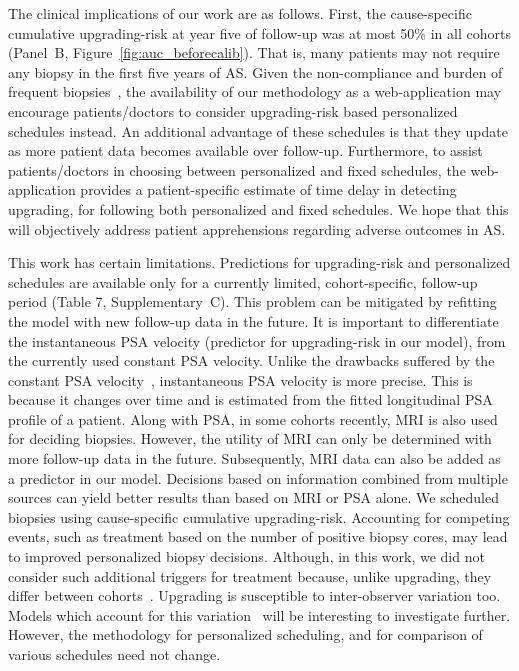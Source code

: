 The clinical implications of our work are as follows. First, the cause-specific cumulative upgrading-risk at year five of follow-up was at most 50\% in all cohorts (Panel~B, Figure~\ref{fig:auc_beforecalib}). That is, many patients may not require any biopsy in the first five years of AS. Given the non-compliance and burden of frequent biopsies~\citep{bokhorst2015compliance}, the availability of our methodology as a web-application may encourage patients/doctors to consider upgrading-risk based personalized schedules instead. An additional advantage of these schedules is that they update as more patient data becomes available over follow-up. Furthermore, to assist patients/doctors in choosing between personalized and fixed schedules, the web-application provides a patient-specific estimate of time delay in detecting upgrading, for following both personalized and fixed schedules. We hope that this will objectively address patient apprehensions regarding adverse outcomes in AS. 

This work has certain limitations. Predictions for upgrading-risk and personalized schedules are available only for a currently limited, cohort-specific, follow-up period (Table 7, Supplementary~C). This problem can be mitigated by refitting the model with new follow-up data in the future. It is important to differentiate the instantaneous PSA velocity (predictor for upgrading-risk in our model), from the currently used constant PSA velocity. Unlike the drawbacks suffered by the constant PSA velocity~\citep{vickers2009psavelocity}, instantaneous PSA velocity is more precise. This is because it changes over time and is estimated from the fitted longitudinal PSA profile of a patient. Along with PSA, in some cohorts recently, MRI is also used for deciding biopsies. However, the utility of MRI can only be determined with more follow-up data in the future. Subsequently, MRI data can also be added as a predictor in our model. Decisions based on information combined from multiple sources can yield better results than based on MRI or PSA alone. We scheduled biopsies using cause-specific cumulative upgrading-risk. Accounting for competing events, such as treatment based on the number of positive biopsy cores, may lead to improved personalized biopsy decisions. Although, in this work, we did not consider such additional triggers for treatment because, unlike upgrading, they differ between cohorts~\citep{nieboer2018active}. Upgrading is susceptible to inter-observer variation too. Models which account for this variation~\citep{coley2017prediction,balasubramanian2003estimation} will be interesting to investigate further. However, the methodology for personalized scheduling, and for comparison of various schedules need not change.